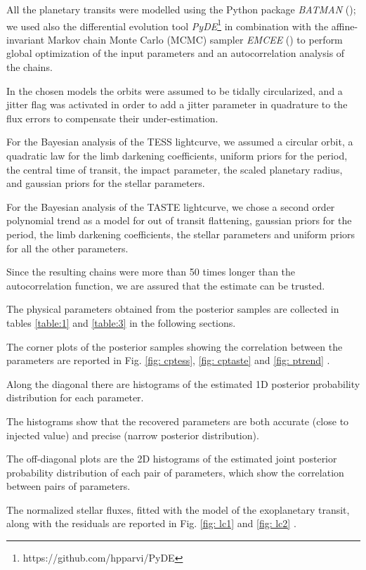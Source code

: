 \documentclass[a4paper,11pt,twocolumn]{article}
\begin{document}
All the planetary transits were modelled using the Python package \textit{BATMAN} (\cite{Kreidberg}); we used also the differential evolution tool \textit{PyDE}\footnote{https://github.com/hpparvi/PyDE} in combination with the affine-invariant Markov chain Monte Carlo (MCMC) sampler \textit{EMCEE} (\cite{Foreman}) to perform global optimization of the input parameters and an autocorrelation analysis of the chains.

In the chosen models the orbits were assumed to be tidally circularized, and a jitter flag was activated in order to add a jitter parameter in quadrature to the flux errors to compensate their under-estimation.

For the Bayesian analysis of the TESS lightcurve, we assumed a circular orbit, a quadratic law for the limb darkening coefficients, uniform priors for the period, the central time of transit, the impact parameter, the scaled planetary radius, and gaussian priors for the stellar parameters.


For the Bayesian analysis of the TASTE lightcurve, we chose a second order polynomial trend as a model for out of transit flattening, gaussian priors for the period, the limb darkening coefficients, the stellar parameters and uniform priors for all the other parameters.

Since the resulting chains were more than 50 times longer than the autocorrelation function, we are assured that the estimate can be trusted.

The physical parameters obtained from the posterior samples are collected in tables \ref{table:1} and \ref{table:3} in the following sections.

The corner plots of the posterior samples showing the correlation between the parameters are reported in Fig. \ref{fig: cptess}, \ref{fig: cptaste} and \ref{fig: ptrend} .

Along the diagonal there are histograms of the estimated 1D posterior probability distribution for each parameter. 

The histograms show that the recovered parameters are both accurate (close to injected value) and precise (narrow posterior distribution). 

The off-diagonal plots are the 2D histograms of the estimated joint posterior probability distribution of each pair of parameters, which show the correlation between pairs of parameters.

The normalized stellar fluxes, fitted with the model of the exoplanetary transit, along with the residuals are reported in Fig. \ref{fig: lc1} and \ref{fig: lc2} .
\end{document}
